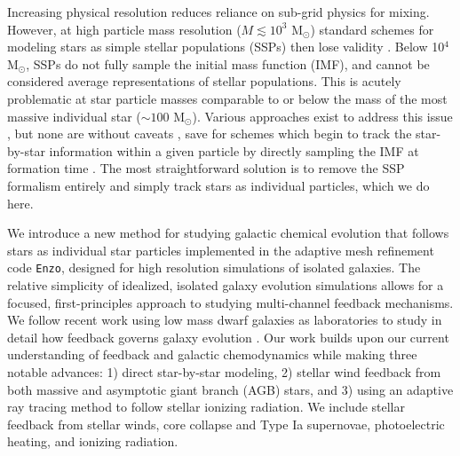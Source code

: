 \documentclass[twocolumn]{aastex61}
\begin{document}
Increasing physical resolution reduces reliance on sub-grid physics for mixing.  However, at high particle mass resolution ($M \lesssim 10^3$ M$_{\odot}$) standard schemes for modeling stars as simple stellar populations (SSPs) then lose validity  \citep[as studied in detail by][]{Revaz2016}. Below 10$^4$ M$_{\odot}$, SSPs do not fully sample the initial mass function (IMF), and cannot be considered average representations of stellar populations. This is acutely problematic at star particle masses comparable to or below the mass of the most massive individual star ($\sim 100$ M$_{\odot}$). Various approaches exist to address this issue \citep[e.g.][]{Kobayashi2000,WeidnerKroupa2004,Pflamm-AltenburgKroupa2006,RevazJablonka2012,Kroupa2013,Rosdahl2015,Su2017b}, but none are without caveats \citep{Revaz2016}, save for schemes which begin to track the star-by-star information within a given particle by directly sampling the IMF at formation time \citep[e.g.][]{Hu2017}.  The most straightforward
solution is to remove the SSP formalism entirely and simply track stars as individual particles,
    which we do here.

We introduce a new method for studying galactic chemical evolution that follows stars as individual star particles implemented in the adaptive mesh refinement code \texttt{Enzo}, designed for high resolution simulations of isolated galaxies. The relative simplicity of idealized, isolated galaxy evolution simulations allows for a focused, first-principles approach to studying multi-channel feedback mechanisms. We follow recent work using low mass dwarf galaxies as laboratories to study in detail how feedback governs galaxy evolution \citep{Forbes2016,Hu2016,Hu2017}.
Our work builds upon our current understanding of feedback and galactic chemodynamics while making three notable advances: 1) direct star-by-star modeling, 2) stellar wind feedback from both massive and asymptotic giant branch (AGB) stars, and 3) using an adaptive ray tracing method to follow stellar ionizing radiation. 
  We include stellar feedback from stellar winds, core collapse and Type Ia supernovae,    
  photoelectric heating, and ionizing radiation.
\end{document}
